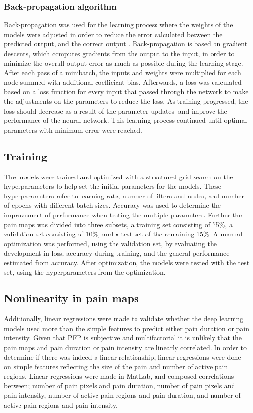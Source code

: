 \subsubsection{Back-propagation algorithm}
Back-propagation was used for the learning process where the weights of the models were adjusted in order to reduce the error calculated between the predicted output, and the correct output \citep{Duda2000}. Back-propagation is based on gradient descents, which computes gradients from the output to the input, in order to minimize the overall output error as much as possible during the learning stage. 
After each pass of a minibatch, the inputs and weights were multiplied for each node summed with additional coefficient bias.\citep{LeCun1998, Hameed2016}
Afterwards, a loss was calculated based on a loss function for every input that passed through the network to make the adjustments on the parameters to reduce the loss. As training progressed, the loss should decrease as a result of the parameter updates, and improve the performance of the neural network.\citep{Goodfellow2016, LeCun2015, Duda2000} This learning process continued until optimal parameters with minimum error were reached.\citep{Hameed2016}

\subsection{Training}
The models were trained and optimized with a structured grid search on the hyperparameters to help set the initial parameters for the models. These hyperparameters refer to learning rate, number of filters and nodes, and number of epochs with different batch sizes. Accuracy was used to determine the improvement of performance when testing the multiple parameters.
Further the pain maps was divided into three subsets, a training set consisting of 75\%, a validation set consisting of 10\%, and a test set of the remaining 15\%. A manual optimization was performed, using the validation set, by evaluating the development in loss, accuracy during training, and the general performance estimated from accuracy. After optimization, the models were tested with the test set, using the hyperparameters from the optimization.
 
 
\subsection{Nonlinearity in pain maps} 
Additionally, linear regressions were made to validate whether the deep learning models used more than the simple features to predict either pain duration or pain intensity.
Given that PFP is subjective and multifactorial it is unlikely that the pain maps and pain duration or pain intensity are linearly correlated. In order to determine if there was indeed a linear relationship, linear regressions were done on simple features reflecting the size of the pain and number of active pain regions. Linear regressions were made in MatLab, and composed correlations between; number of pain pixels and pain duration, number of pain pixels and pain intensity, number of active pain regions and pain duration, and number of active pain regions and pain intensity.

